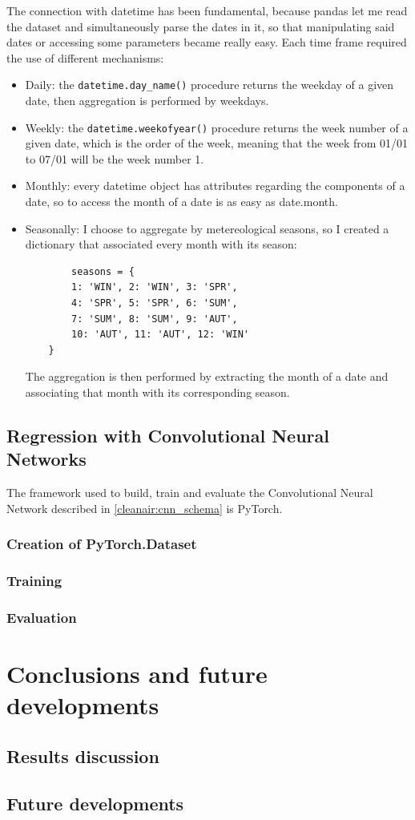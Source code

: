 \documentclass[11pt,a4paper,titlepage]{book}
\begin{document}
The connection with datetime has been fundamental, because pandas let me read the dataset and simultaneously parse the dates in it, so that manipulating said dates or accessing some parameters became really easy. 
\newline
\newline
Each time frame required the use of different mechanisms:
\begin{itemize}
    \item Daily: the \verb|datetime.day_name()| procedure returns the weekday of a given date, then aggregation is performed by weekdays.
    \item Weekly: the \verb|datetime.weekofyear()| procedure returns the week number of a given date, which is the order of the week, meaning that the week from 01/01 to 07/01 will be the week number 1.
    \item Monthly: every datetime object has attributes regarding the components of a date, so to access the month of a date is as easy as date.month.
    \item Seasonally: I choose to aggregate by metereological seasons, so I created a dictionary that associated every month with its season:
    \begin{verbatim}
        seasons = {
        1: 'WIN', 2: 'WIN', 3: 'SPR',
        4: 'SPR', 5: 'SPR', 6: 'SUM',
        7: 'SUM', 8: 'SUM', 9: 'AUT',
        10: 'AUT', 11: 'AUT', 12: 'WIN'
    }
    \end{verbatim}
    The aggregation is then performed by extracting the month of a date and associating that month with its corresponding season.
\end{itemize}


\section{Regression with Convolutional Neural Networks}
The framework used to build, train and evaluate the Convolutional Neural Network described in \ref{cleanair:cnn_schema} is PyTorch. 

\subsection{Creation of PyTorch.Dataset}
\subsection{Training}
\subsection{Evaluation}

\chapter{Conclusions and future developments}
\section{Results discussion}
\section{Future developments}

\printbibliography[heading=bibintoc,title={Bibliography}]
\end{document}
